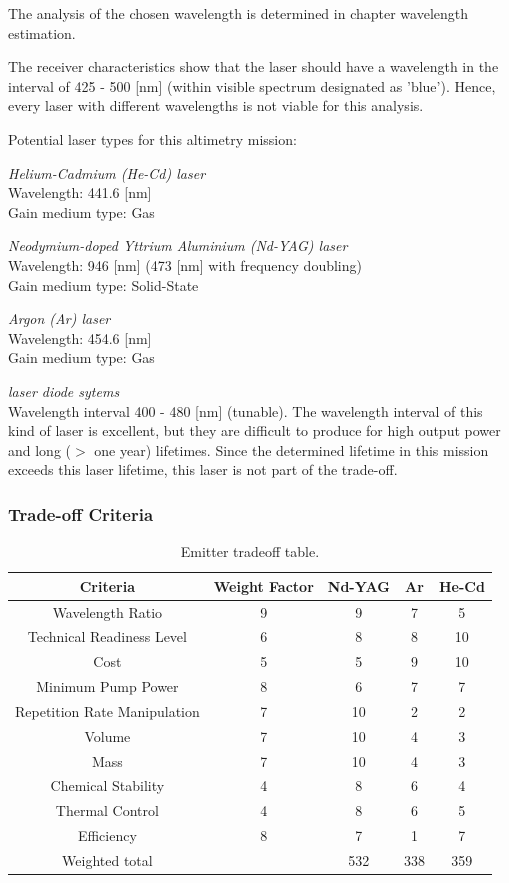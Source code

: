 The analysis of the chosen wavelength is determined in chapter wavelength estimation.

The receiver characteristics show that the laser should have a wavelength in the interval of 425 - 500 [nm] (within visible spectrum designated as 'blue'). Hence, every \acs{laser} with different wavelengths is not viable for this analysis.

Potential \acs{laser} types for this altimetry mission:

\textit{Helium-Cadmium (He-Cd) \acs{laser}}\\
Wavelength: 441.6 [nm]\\
Gain medium type: Gas

\textit{Neodymium-doped Yttrium Aluminium (Nd-YAG) \acs{laser}}\\
Wavelength: 946 [nm] (473 [nm] with frequency doubling)\\
Gain medium type: Solid-State

\textit{Argon (Ar) \acs{laser}}\\	
Wavelength: 454.6 [nm]\\
Gain medium type: Gas

\textit{\acs{laser} diode sytems}\\
Wavelength interval 400 - 480 [nm] (tunable). The wavelength interval of this kind of \acs{laser} is excellent, but they are difficult to produce for high output power and long ($>$ one year) lifetimes. Since the determined lifetime in this mission exceeds this \acs{laser} lifetime, this \acs{laser} is not part of the trade-off.
	
	\subsubsection{Trade-off Criteria}

\begin{table}[h]
	\centering
		\begin{tabular}{c|c|c|c|c}
		 \textbf{Criteria} & \textbf{Weight Factor} & \textbf{Nd-YAG} & \textbf{Ar} & \textbf{He-Cd} \\ \hline \hline
		 Wavelength Ratio & 9 & 9 & 7 & 5 \\
		 Technical Readiness Level & 6 & 8 & 8 & 10 \\
		 Cost & 5 & 5 & 9 & 10 \\ 
		 Minimum Pump Power & 8 & 6 & 7 & 7 \\
		 Repetition Rate Manipulation & 7 & 10 & 2 & 2 \\ 
		 Volume & 7 & 10 & 4 & 3 \\ 
		 Mass & 7 & 10 & 4 & 3  \\
		 Chemical Stability & 4 & 8 & 6 & 4 \\
		 Thermal Control & 4 & 8 & 6 & 5 \\
		 Efficiency & 8 & 7 & 1 & 7 \\ \hline
		 Weighted total &   & 532 & 338 & 359
			
		\end{tabular}
	\caption{Emitter tradeoff table.}
	\label{table:emitterTradeTable}
\end{table}

